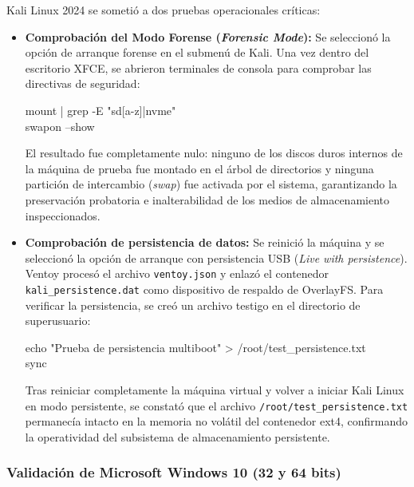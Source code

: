 \documentclass[12pt]{article}
\begin{document}
Kali Linux 2024 se sometió a dos pruebas operacionales críticas:
\begin{itemize}[noitemsep, topsep=2pt]
    \item \textbf{Comprobación del Modo Forense (\textit{Forensic Mode}):}
    Se seleccionó la opción de arranque forense en el submenú de Kali. Una vez dentro del escritorio XFCE, se abrieron terminales de consola para comprobar las directivas de seguridad:
    \begin{mdframed}[style=terminal]
    \ttfamily\upshape\color{bashLetterColor}\footnotesize
    mount | grep -E "sd[a-z]|nvme" \\
    swapon --show
    \end{mdframed}
    El resultado fue completamente nulo: ninguno de los discos duros internos de la máquina de prueba fue montado en el árbol de directorios y ninguna partición de intercambio (\textit{swap}) fue activada por el sistema, garantizando la preservación probatoria e inalterabilidad de los medios de almacenamiento inspeccionados.
    \item \textbf{Comprobación de persistencia de datos:}
    Se reinició la máquina y se seleccionó la opción de arranque con persistencia USB (\textit{Live with persistence}). Ventoy procesó el archivo \texttt{ventoy.json} y enlazó el contenedor \texttt{kali\_persistence.dat} como dispositivo de respaldo de OverlayFS. Para verificar la persistencia, se creó un archivo testigo en el directorio de superusuario:
    \begin{mdframed}[style=terminal]
    \ttfamily\upshape\color{bashLetterColor}\footnotesize
    echo "Prueba de persistencia multiboot" > /root/test\_persistence.txt \\
    sync
    \end{mdframed}
    Tras reiniciar completamente la máquina virtual y volver a iniciar Kali Linux en modo persistente, se constató que el archivo \texttt{/root/test\_persistence.txt} permanecía intacto en la memoria no volátil del contenedor ext4, confirmando la operatividad del subsistema de almacenamiento persistente.
\end{itemize}

\subsubsection{Validación de Microsoft Windows 10 (32 y 64 bits)}
\end{document}
